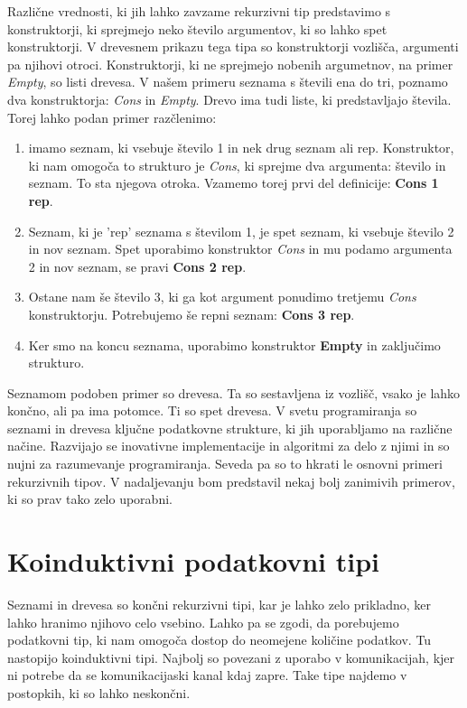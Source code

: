 \documentclass[12pt,a4paper,openany]{book}
\begin{document}
Različne vrednosti, ki jih lahko zavzame rekurzivni tip predstavimo s konstruktorji, ki sprejmejo neko število argumentov, ki so lahko spet konstruktorji. V drevesnem prikazu tega tipa so 
konstruktorji vozlišča, argumenti pa njihovi otroci. Konstruktorji, ki ne sprejmejo nobenih argumetnov, na primer \emph{Empty}, so listi drevesa. V našem primeru seznama s števili 
ena do tri, poznamo dva konstruktorja: \emph{Cons} in \emph{Empty}. Drevo ima tudi liste, ki predstavljajo števila. Torej lahko podan primer razčlenimo:
\begin{enumerate}
    \item imamo seznam, ki vsebuje število 1 in nek drug seznam ali rep. Konstruktor, ki nam omogoča to strukturo je \emph{Cons}, ki sprejme dva argumenta: število in seznam. To sta 
    njegova otroka. Vzamemo torej prvi del definicije: \textbf{Cons 1 rep}.
    \item Seznam, ki je 'rep' seznama s številom 1, je spet seznam, ki vsebuje število 2 in nov seznam. Spet uporabimo konstruktor \emph{Cons} in mu podamo argumenta 2 in nov seznam, se pravi 
    \textbf{Cons 2 rep}.
    \item Ostane nam še število 3, ki ga kot argument ponudimo tretjemu \emph{Cons} konstruktorju. Potrebujemo še repni seznam: \textbf{Cons 3 rep}.
    \item Ker smo na koncu seznama, uporabimo konstruktor \textbf{Empty} in zaključimo strukturo.
\end{enumerate}

Seznamom podoben primer so drevesa. Ta so sestavljena iz vozlišč, vsako je lahko končno, ali pa ima potomce. Ti so spet drevesa. V svetu programiranja so seznami in 
drevesa ključne podatkovne strukture, ki jih uporabljamo na različne načine. Razvijajo se inovativne implementacije in algoritmi za delo z njimi in so nujni za razumevanje programiranja.
Seveda pa so to hkrati le osnovni primeri rekurzivnih tipov. V nadaljevanju bom predstavil nekaj bolj zanimivih primerov, ki so prav tako zelo uporabni.

\section{Koinduktivni podatkovni tipi}
Seznami in drevesa so končni rekurzivni tipi, kar je lahko zelo prikladno, ker lahko hranimo njihovo celo vsebino. Lahko pa se zgodi, da porebujemo podatkovni tip, ki nam omogoča dostop do 
neomejene količine podatkov. Tu nastopijo koinduktivni tipi. Najbolj so povezani z uporabo v komunikacijah, kjer ni potrebe da se komunikacijaski kanal kdaj zapre. Take tipe najdemo v  
postopkih, ki so lahko neskončni. 
\end{document}
